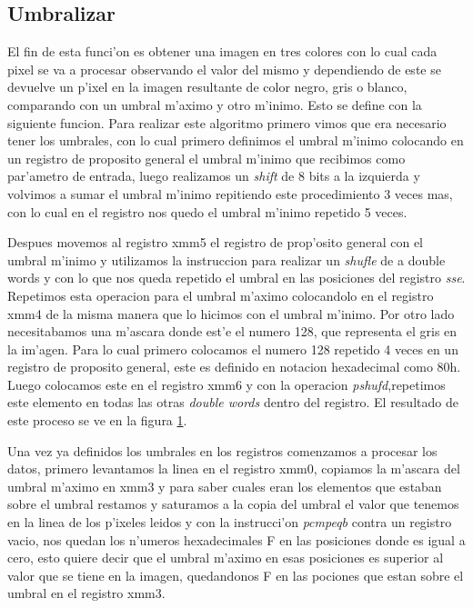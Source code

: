 \subsection{Umbralizar}
El fin de esta funci'on es obtener una imagen en tres colores con lo cual cada pixel se va a procesar observando el valor del 
mismo y dependiendo de este se devuelve un p'ixel en la imagen resultante de color negro, gris o blanco, 
comparando con un umbral m'aximo y otro m'inimo.
Esto se define con la siguiente funcion.
Para realizar este algoritmo primero vimos que era necesario tener los umbrales, con lo cual primero definimos el umbral 
m'inimo colocando en un registro de proposito general el umbral m'inimo que recibimos como par'ametro de entrada, 
luego realizamos un \textit{shift} de 8 bits a la izquierda y volvimos a sumar el umbral m'inimo repitiendo este procedimiento 3 veces mas, 
con lo cual en el registro nos quedo el umbral m'inimo repetido 5 veces.

Despues movemos al registro xmm5 el registro de prop'osito general con el umbral m'inimo y utilizamos la instruccion para 
realizar un \textit{shufle} de a double words y con lo que nos queda repetido el umbral en las posiciones del registro \textit{sse}. 
Repetimos esta operacion para el umbral m'aximo colocandolo en el registro xmm4 de la misma manera que lo hicimos con el umbral m'inimo.
Por otro lado necesitabamos una m'ascara donde est'e el numero 128, que representa el gris en la im'agen.
Para lo cual primero colocamos el numero 128 repetido 4 veces en un registro de proposito general,  
este es definido en notacion hexadecimal como 80h. Luego colocamos este en el registro xmm6 y con la operacion 
\textit{pshufd},repetimos este elemento en todas las otras \textit{double words} dentro del registro.
El resultado de este proceso se ve en la figura \ref{est:u-uno}.

\begin{figure}[ht]
\label{est:u-uno}
\end{figure}

Una vez ya definidos los umbrales en los registros comenzamos a procesar los datos, primero levantamos la linea 
en el registro xmm0, copiamos la m'ascara del umbral m'aximo en xmm3 y para saber cuales eran los elementos que estaban
sobre el umbral restamos y saturamos a la copia del umbral el valor que tenemos en la linea de los p'ixeles leidos y con 
la instrucci'on \textit{pcmpeqb} contra un registro vacio, nos quedan los n'umeros hexadecimales F en las posiciones donde es igual a cero, 
esto quiere decir que el umbral m'aximo en esas posiciones es superior al valor que se tiene en la imagen, quedandonos F 
en las pociones que estan sobre el umbral en el registro xmm3.

